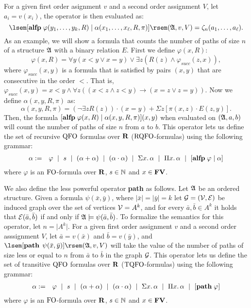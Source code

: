 For a given first order asignment $v$ and a second order assignment $V$, let $a_i = v(x_i)$, the operator is then evaluated as:
$$
\sem{[\alfp\varphi(y_1,\ldots,y_k,R)\mid\alpha(x_1,\ldots,x_{\ell},R,\pi)]}(\A,v,V) = \zeta_n(a_1,\ldots,a_{\ell}).
$$
As an example, we will show a formula that counts the number of paths of size $n$ of a structure $\mathfrak{A}$ with a binary relation $E$. First we define $\varphi(x,R)$:
$$
\varphi(x,R) = \forall y(x < y \vee x = y) \vee \exists z(R(z) \wedge \varphi_{succ}(z,x)),
$$
where $\varphi_{succ}(x,y)$ is a formula that is satisfied by pairs $(x,y)$ that are consecutive in the order $<$. That is, $\varphi_{succ}(x,y) = x < y \wedge \forall z((x < z \wedge z < y) \to (x = z \vee z = y) )$. Now we define $\alpha(x,y,R,\pi)$ as:
$$
\alpha(x,y,R,\pi) = (\neg \exists zR(z))\cdot(x = y) + \Sigma z[\pi(x,z)\cdot E(z,y)].
$$
Then, the formula $[{\bf alfp} \;\varphi(x,R)\mid \alpha(x,y,R,\pi)](x,y)$ when evaluated on $(\mathfrak{A},a,b)$ will count the number of paths of size $n$ from $a$ to $b$.
This operator lets us define the set of recursive ${\rm QFO}$ formulas over $\mathbf{R}$ (${\rm RQFO}$-formulas) using the following grammar:
\begin{eqnarray*}
\label{eq-def-rqfo}
\alpha & := & \varphi \ \mid \ s \ \mid \ (\alpha \add \alpha) \ \mid\ (\alpha \mult \alpha) \ \mid \ \sa{x} \alpha \ \mid \ \pa{x} \alpha \ \mid \ [\alfp \varphi \mid \alpha]
\end{eqnarray*}
where $\varphi$ is an ${\rm FO}$-formula over $\mathbf{R}$, $s \in \mathbb{N}$ and $x \in \mathbf{FV}$.

We also define the less powerful operator {\bf path} as follows. Let $\mathfrak{A}$ be an ordered structure. Given a formula $\psi(\bar{x},\bar{y})$, where $\vert \bar{x} \vert = \vert \bar{y} \vert = k$ let ${\cal G} = ({\cal V},\cal{E})$ be induced graph over the set of vertices ${\cal V} = A^k$, and for every $\bar{a},\bar{b}\in A^k$ it holds that ${\cal E}(\bar{a},\bar{b})$ if and only if $\mathfrak{A} \models \psi(\bar{a},\bar{b})$. To formalize the semantics for this operator, let $n = \vert A^k \vert$.
For a given first order assignment $v$ and a second order asssignment $V$, let $\bar{a} = v(\bar{x})$ and $\bar{b} = v(\bar{y})$, and $\sem{[\pth\, \psi(\bar{x},\bar{y})]}(\A,v,V)$ will take the value of the number of paths of size less or equal to $n$ from $\bar{a}$ to $\bar{b}$ in the graph ${\cal G}$. This operator lets us define the set of transitive ${\rm QFO}$ formulas over $\mathbf{R}$ (${\rm TQFO}$-formulas) using the following grammar:
\begin{eqnarray*}
	\label{eq-def-tqfo}	\alpha & := & \varphi \ \mid \ s \ \mid \ (\alpha + \alpha) \ \mid\ (\alpha \cdot \alpha) \ \mid \ \Sigma{x}.\, \alpha \ \mid \ \Pi{x}.\, \alpha \ \mid \ [{\bf path} \; \varphi]
\end{eqnarray*}
where $\varphi$ is an ${\rm FO}$-formula over $\mathbf{R}$, $s \in \mathbb{N}$ and $x \in \mathbf{FV}$.

